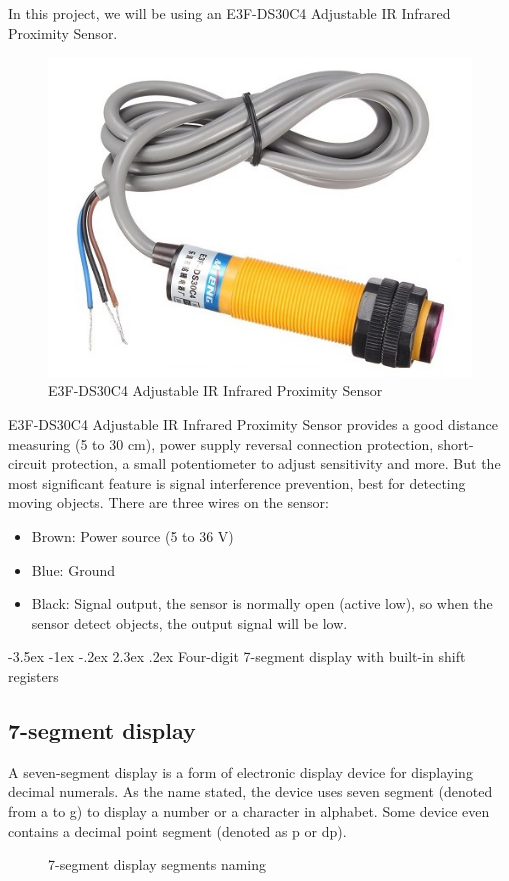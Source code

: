 \documentclass[a4paper,twoside]{report}
\makeatletter
\renewcommand\section{\@startsection {section}{1}{-1em}%
  {-3.5ex \@plus -1ex \@minus -.2ex}%
  {2.3ex \@plus.2ex}%
  {\normalfont\Large\bfseries}}
\makeatother
\begin{document}

In this project, we will be using an E3F-DS30C4 Adjustable IR Infrared Proximity Sensor.

\begin{figure}[H]
\centering
\includegraphics[scale=0.4]{images/prox_sensor.jpg}
\caption{E3F-DS30C4 Adjustable IR Infrared Proximity Sensor}
\end{figure}

E3F-DS30C4 Adjustable IR Infrared Proximity Sensor provides a good distance measuring (5 to 30 cm), power supply reversal connection protection, short-circuit protection, a small potentiometer to adjust sensitivity and more. But the most significant feature is signal interference prevention, best for detecting moving objects. There are three wires on the sensor:
\begin{itemize}
\item Brown: Power source (5 to 36 V)
\item Blue: Ground
\item Black: Signal output, the sensor is normally open (active low), so when the sensor detect objects, the output signal will be low.
\end{itemize}

\section{Four-digit 7-segment display with built-in shift registers}
\subsection{7-segment display}
A seven-segment display is a form of electronic display device for displaying decimal numerals. As the name stated, the device uses seven segment (denoted from a to g) to display a number or a character in alphabet. Some device even contains a decimal point segment (denoted as p or dp). \cite{wiki:7seg}
\begin{figure}[H]
\centering
\def\svgwidth{.17\textwidth}

\caption{7-segment display segments naming}
\end{figure}
\end{document}
